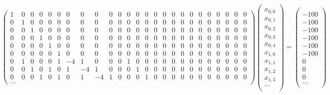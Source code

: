 \[\begin{pmatrix}
 1 & 0 & 0 & 0 & 0 & 0 & 0 & 0 & 0 & 0 & 0 & 0 & 0 & 0 & 0 & 0 & 0 & 0 & 0 & 0 & 0 & 0 & 0 & 0 & 0\\
 0 & 1 & 0 & 0 & 0 & 0 & 0 & 0 & 0 & 0 & 0 & 0 & 0 & 0 & 0 & 0 & 0 & 0 & 0 & 0 & 0 & 0 & 0 & 0 & 0\\
 0 & 0 & 1 & 0 & 0 & 0 & 0 & 0 & 0 & 0 & 0 & 0 & 0 & 0 & 0 & 0 & 0 & 0 & 0 & 0 & 0 & 0 & 0 & 0 & 0\\
 0 & 0 & 0 & 1 & 0 & 0 & 0 & 0 & 0 & 0 & 0 & 0 & 0 & 0 & 0 & 0 & 0 & 0 & 0 & 0 & 0 & 0 & 0 & 0 & 0\\
 0 & 0 & 0 & 0 & 1 & 0 & 0 & 0 & 0 & 0 & 0 & 0 & 0 & 0 & 0 & 0 & 0 & 0 & 0 & 0 & 0 & 0 & 0 & 0 & 0\\
 0 & 0 & 0 & 0 & 0 & 1 & 0 & 0 & 0 & 0 & 0 & 0 & 0 & 0 & 0 & 0 & 0 & 0 & 0 & 0 & 0 & 0 & 0 & 0 & 0\\
 0 & 1 & 0 & 0 & 0 & 1 & -4 & 1 & 0 & 0 & 0 & 1 & 0 & 0 & 0 & 0 & 0 & 0 & 0 & 0 & 0 & 0 & 0 & 0& 0 \\
 0 & 0 & 1 & 0 & 1 & 0 & 1 & -4 & 1 & 0 & 0 & 0 & 1 & 0 & 0 & 0 & 0 & 0 & 0 & 0 & 0 & 0 & 0 & 0& 0 \\
 0 & 0 & 0 & 1 & 0 & 1 & 0 & 1 & -4 & 1 & 0 & 0 & 0 & 1 & 0 & 0 & 0 & 0 & 0 & 0 & 0 & 0 & 0 & 0& 0 \\
...
\end{pmatrix}
\begin{pmatrix} \\ x_{0,0}\\ x_{0,1}\\ x_{0,2}\\ x_{0,3} \\ x_{0,4} \\ x_{1,0}\\ x_{1,1} \\ x_{1,2} \\ x_{1,3} \\ ... \\ \end{pmatrix}
=
\begin{pmatrix}  \\ -100\\ -100\\ -100\\ -100\\ -100\\ -100 \\ 0 \\ 0 \\ 0 \\ ... \\ \end{pmatrix}
\]

